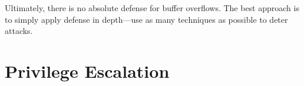 






Ultimately, there is no absolute defense for buffer overflows. The best approach is to simply apply defense in depth---use as many techniques as possible to deter attacks.

\section{Privilege Escalation}

